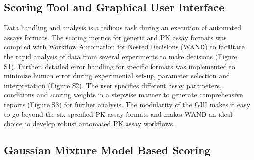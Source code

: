 \subsection{Scoring Tool and Graphical User Interface}
Data handling and analysis is a tedious task during an execution of automated assays formats. The scoring metrics for generic and PK assay formats was compiled with Workflow Automation for Nested Decisions (WAND) to facilitate the rapid analysis of data from several experiments to make decisions (Figure S1). Further, detailed error handling for specific formats was implemented to minimize human error during experimental set-up, parameter selection and interpretation (Figure S2). The user specifies different assay parameters, conditions and scoring weights in a stepwise manner to generate comprehensive reports (Figure S3) for further analysis. The modularity of the GUI makes it easy to go beyond the six specified PK assay formats and makes WAND an ideal choice to develop robust automated PK assay workflows.

\subsection{Gaussian Mixture Model Based Scoring}

